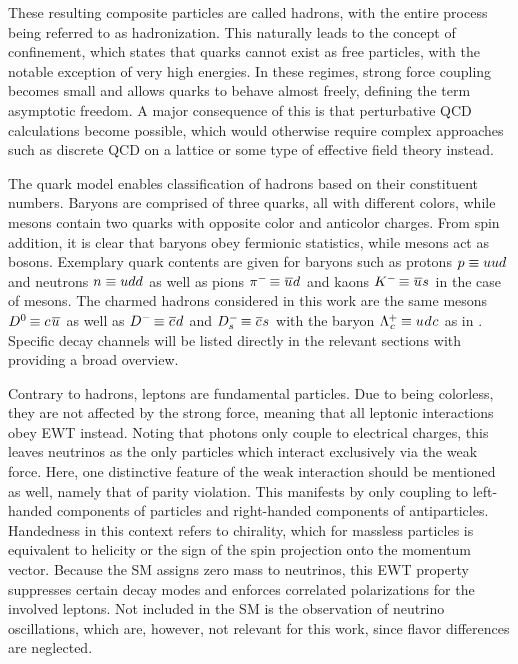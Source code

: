 These resulting composite particles are called hadrons, with the entire process being referred to as hadronization. This naturally
leads to the concept of confinement, which states that quarks cannot exist as free particles, with the notable exception of very
high energies. In these regimes, strong force coupling becomes small and allows quarks to behave almost freely, defining the term
asymptotic freedom. A major consequence of this is that perturbative QCD calculations become possible, which would otherwise
require complex approaches such as discrete QCD on a lattice or some type of effective field theory instead.

The quark model enables classification of hadrons based on their constituent numbers. Baryons are comprised of three quarks, all
with different colors, while mesons contain two quarks with opposite color and anticolor charges. From spin addition, it is clear
that baryons obey fermionic statistics, while mesons act as bosons. Exemplary quark contents are given for baryons such as protons
$p \equiv uud \kern+0.5pt$ and neutrons $n \equiv udd \kern+0.5pt$ as well as pions
$\pi^- \kern-1.0pt \equiv \kern+0.75pt \overline{\kern-0.5pt u \kern+0.5pt} d \kern+0.5pt$ and kaons
$K^- \kern-1.0pt \equiv \kern+0.75pt \overline{\kern-0.5pt u \kern+0.5pt} s \kern+0.5pt$ in the case of mesons.
The charmed hadrons considered in this work are the same mesons
$D^0 \kern-0.75pt \equiv c \kern+1.25pt \overline{\kern-0.5pt u \kern+0.5pt} \kern+0.5pt$ as well as
$D^- \kern-1.0pt \equiv \kern+0.5pt \overline{\kern-0.25pt c \kern+0.75pt} d \kern+0.5pt$
and $D^-_s \kern-1.0pt \equiv \kern+0.5pt \overline{\kern-0.25pt c \kern+0.75pt} s \kern+0.5pt$
with the baryon $\Lambda^{\kern-0.5pt +}_{\kern+0.5pt c} \kern-0.5pt \equiv u \kern+0.5pt d \kern+0.5pt c \kern+0.5pt$
as in \cite{Carpio_2020}. Specific decay channels will be listed directly in the relevant sections
with \cite{pdg} providing a broad overview.

Contrary to hadrons, leptons are fundamental particles. Due to being colorless, they are not affected by the strong force, meaning
that all leptonic interactions obey EWT instead. Noting that photons only couple to electrical charges, this leaves neutrinos as the
only particles which interact exclusively via the weak force. Here, one distinctive feature of the weak interaction should be
mentioned as well, namely that of parity violation. This manifests by only coupling to left-handed components of particles and
right-handed components of antiparticles. Handedness in this context refers to chirality, which for massless particles is equivalent
to helicity or the sign of the spin projection onto the momentum vector. Because the SM assigns zero mass to neutrinos, this EWT
property suppresses certain decay modes and enforces correlated polarizations for the involved leptons. Not included in the SM is
the observation of neutrino oscillations, which are, however, not relevant for this work, since flavor differences are neglected.



